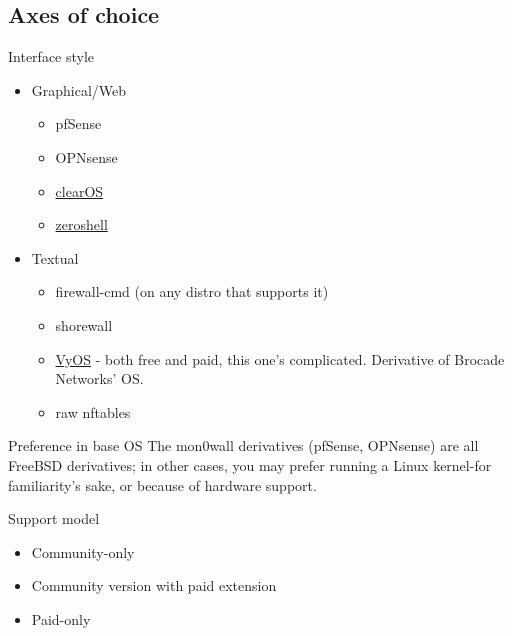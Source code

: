 \documentclass[bigger,aspectratio=169]{beamer}
\begin{document}
\subsection{Axes of choice}
\label{sec:org84da425}

\subsectionpage

\begin{frame}[label={sec:orgb205e75}]{Interface style}

  \begin{itemize}
  \item<2-> Graphical/Web
    \begin{itemize}
    \item pfSense
    \item OPNsense
    \item \href{https://www.clearos.com/}{clearOS}
    \item \href{https://zeroshell.org/}{zeroshell}
    \end{itemize}

  \item<3-> Textual
    \begin{itemize}
    \item firewall-cmd (on any distro that supports it)
    \item shorewall
    \item \href{https://www.vyos.io/}{VyOS} - both free and paid, this one's complicated. Derivative of Brocade
      Networks' OS.
    \item raw nftables
    \end{itemize}
  \end{itemize}
\end{frame}

\begin{frame}[label={sec:orgdb902ba}]{Preference in base OS}
The mon0wall derivatives (pfSense, OPNsense) are all FreeBSD derivatives; in
other cases, you may prefer running a Linux kernel-for familiarity's sake,
or because of hardware support.
\end{frame}

\begin{frame}[label={sec:org991cbe7}]{Support model}
  \begin{itemize}
  \item Community-only
  \item Community version with paid extension
  \item Paid-only
  \end{itemize}
\end{frame}
\end{document}
